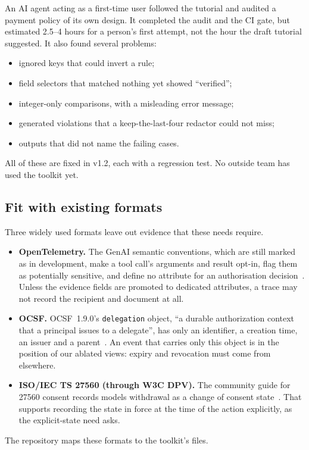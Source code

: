 \documentclass[11pt]{article}
\newcommand{\code}[1]{\texttt{#1}}
\begin{document}
An AI agent acting as a first-time user followed the tutorial and audited a payment policy of its own design. It completed the audit and the CI gate, but estimated 2.5--4 hours for a person's first attempt, not the hour the draft tutorial suggested. It also found several problems:
\begin{itemize}
  \item ignored keys that could invert a rule;
  \item field selectors that matched nothing yet showed ``verified'';
  \item integer-only comparisons, with a misleading error message;
  \item generated violations that a keep-the-last-four redactor could not miss;
  \item outputs that did not name the failing cases.
\end{itemize}
All of these are fixed in v1.2, each with a regression test. No outside team has used the toolkit yet.

\subsection*{Fit with existing formats}

Three widely used formats leave out evidence that these needs require.
\begin{itemize}
  \item \textbf{OpenTelemetry.} The GenAI semantic conventions, which are still marked as in development, make a tool call's arguments and result opt-in, flag them as potentially sensitive, and define no attribute for an authorisation decision~\cite{otelgenai}. Unless the evidence fields are promoted to dedicated attributes, a trace may not record the recipient and document at all.
  \item \textbf{OCSF.} OCSF~1.9.0's \code{delegation} object, ``a durable authorization context that a principal issues to a delegate'', has only an identifier, a creation time, an issuer and a parent~\cite{ocsfdelegation}. An event that carries only this object is in the position of our ablated views: expiry and revocation must come from elsewhere.
  \item \textbf{ISO/IEC TS 27560 (through W3C DPV).} The community guide for 27560 consent records models withdrawal as a change of consent state~\cite{dpv27560}. That supports recording the state in force at the time of the action explicitly, as the explicit-state need asks.
\end{itemize}
The repository maps these formats to the toolkit's files.
\end{document}
